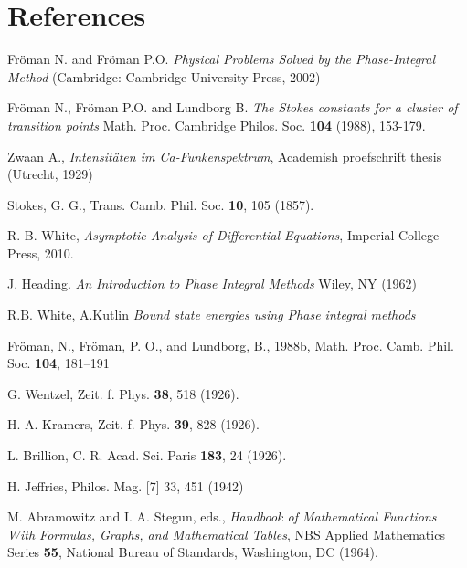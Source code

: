 \documentclass[12pt]{iopart}
\begin{document}
\section*{References}
\begin{thebibliography}{30}

 Fr\"oman N. and Fr\"oman P.O. \textit{Physical Problems Solved by the Phase-Integral Method} (Cambridge: Cambridge University Press, 2002)

 Fr\"oman N., Fr\"oman P.O. and Lundborg B. \textit{The Stokes constants for a cluster of transition
points} Math. Proc. Cambridge Philos. Soc. \textbf{104} (1988), 153-179.

 Zwaan A., \textit{Intensit\"aten im Ca-Funkenspektrum}, Academish proefschrift thesis (Utrecht, 1929)

 Stokes, G. G., Trans. Camb. Phil. Soc. \textbf{10}, 105 (1857).

 R. B. White,
 {\it Asymptotic Analysis of Differential Equations}, Imperial College Press, 2010.

 J. Heading. {\it An Introduction to Phase Integral Methods} 
Wiley, NY (1962)

 R.B. White, A.Kutlin {\it Bound state energies using Phase integral methods} 

%

 Fr\"oman, N., Fr\"oman, P. O., and Lundborg, B., 1988b, 
Math. Proc. Camb. Phil. Soc. \textbf{104}, 181–191

 G. Wentzel, Zeit. f. Phys. \textbf{38}, 518 (1926).

 H. A. Kramers, Zeit. f. Phys. \textbf{39}, 828 (1926).

 L. Brillion, C. R. Acad. Sci. Paris \textbf{183}, 24 (1926).

 H. Jeffries, Philos. Mag. [7] 33, 451 (1942)

 M. Abramowitz and I. A. Stegun, eds., 
{\it Handbook of Mathematical Functions With Formulas, Graphs, and Mathematical Tables}, 
NBS Applied Mathematics Series \textbf{55}, National Bureau of Standards, Washington, DC (1964).

\end{thebibliography}
\end{document}
